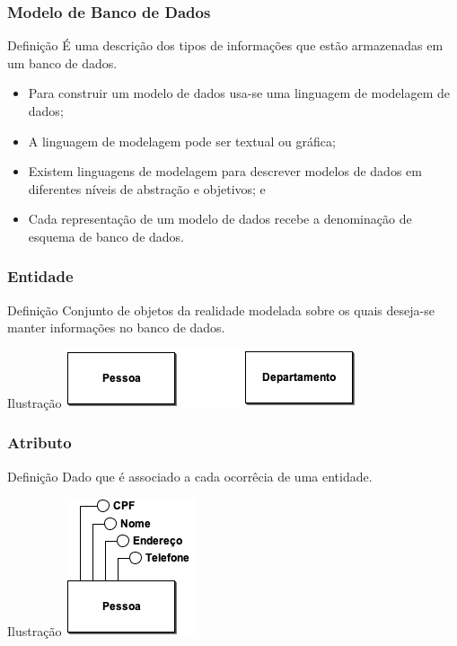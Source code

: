 \documentclass{beamer}
\begin{document}
\begin{frame}
\frametitle{Modelo de 	Banco de Dados}

\begin{block}{Definição}
	É uma descrição dos tipos de informações que estão armazenadas em um
	banco de dados.
\end{block} \vfill

\begin{itemize}
	\item Para construir um modelo de dados usa-se uma linguagem de
	modelagem de dados;
	\item A linguagem de modelagem pode ser textual ou gráfica;
	\item Existem linguagens de modelagem para descrever modelos de dados
	em diferentes níveis de abstração e objetivos; e
	\item Cada representação de um modelo de dados recebe a denominação de
	esquema de banco de dados.
\end{itemize}
\end{frame}

\begin{frame}
\frametitle{Entidade}

\begin{block}{Definição}
	Conjunto de objetos da realidade modelada sobre os quais deseja-se manter
	informações no banco de dados.
\end{block} \vfill

\begin{exampleblock}{Ilustração}
	\centering
	\includegraphics[scale=2.5]{img/entidades}
\end{exampleblock}
\end{frame}

\begin{frame}
\frametitle{Atributo}

\begin{block}{Definição}
	Dado que é associado a cada ocorrêcia de uma entidade.
\end{block} \vfill

\begin{exampleblock}{Ilustração}
	\centering
	\includegraphics[scale=2.5]{img/atributos}
\end{exampleblock}
\end{frame}
\end{document}
